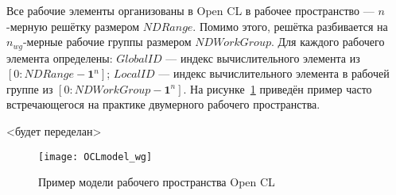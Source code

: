 

Все рабочие элементы организованы в Open CL в рабочее пространство ---
$n$-мерную решётку %
размером $NDRange$.
Помимо этого, %
решётка разбивается на $n_{wg}$-мерные рабочие группы
размером $NDWorkGroup$. 
Для каждого рабочего элемента %
определены:  
$GlobalID$ %
--- индекс вычислительного элемента из $[0: NDRange - \mathbf{1}^n]$;
$LocalID$ --- индекс вычислительного элемента в рабочей группе
из $[0: NDWorkGroup - \mathbf{1}^n]$. 
На рисунке~\ref{fig:OCL_wg} приведён пример
часто встречающегося на практике двумерного рабочего пространства.

<будет переделан>
\begin{figure}[h!]
  \centering
  \texttt{[image: OCLmodel\_wg]} 
  \caption{Пример модели рабочего пространства Open CL}
  \label{fig:OCL_wg}
\end{figure}
\FloatBarrier





